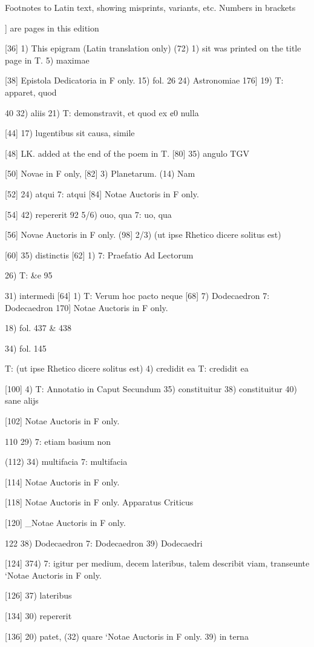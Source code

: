 \documentclass{article}
\begin{document}
Footnotes to Latin text, showing misprints, variants, etc. Numbers in brackets {] are pages in this
edition

[36] 1) This epigram (Latin translation only) (72) 1) sit
was printed on the title page in T. 5) maximae

[38] Epistola Dedicatoria in F only. 15) fol. 26
24) Astronomiae 176] 19) T: apparet, quod

{40} 32) aliis 21) T: demonstravit, et quod ex ¢0 nulla

[44] 17) lugentibus sit causa, simile

[48] LK. added at the end of the poem in T. [80] 35) angulo TGV

[50] Novae in F only, [82] 3) Planetarum. (14) Nam

[52] 24) atqui 7: atqui [84] Notae Auctoris in F only.

[54] 42) repererit {92} 5/6) ouo, qua 7: uo, qua

[56] Novae Auctoris in F only. (98] 2/3) (ut ipse Rhetico dicere solitus est)

[60] 35) distinctis
[62] 1) 7: Praefatio Ad Lectorum

26) T: &e 95

31) intermedi
[64] 1) T: Verum hoc pacto neque
[68] 7) Dodecaedron 7: Dodecaedron
170] Notae Auctoris in F only.

18) fol. 437 & 438

34) fol. 145

T: (ut ipse Rhetico dicere solitus est)
4) credidit ea T: credidit ea

[100] 4) T: Annotatio in Caput Secundum
35) constituitur
38) constituitur
40) sane alijs

[102] Notae Auctoris in F only.

{110} 29) 7: etiam basium non

(112) 34) multifacia 7: multifacia

[114] Notae Auctoris in F only.

[118] Notae Auctoris in F only.
Apparatus Criticus

[120] _Notae Auctoris in F only.

{122} 38) Dodecaedron 7: Dodecaedron
39) Dodecaedri

[124] 374) 7: igitur per medium, decem
lateribus, talem describit viam,
transeunte
‘Notae Auctoris in F only.

[126] 37) lateribus

[134] 30) repererit

[136] 20) patet, (32) quare
‘Notae Auctoris in F only.
39) in terna

}
\end{document}
